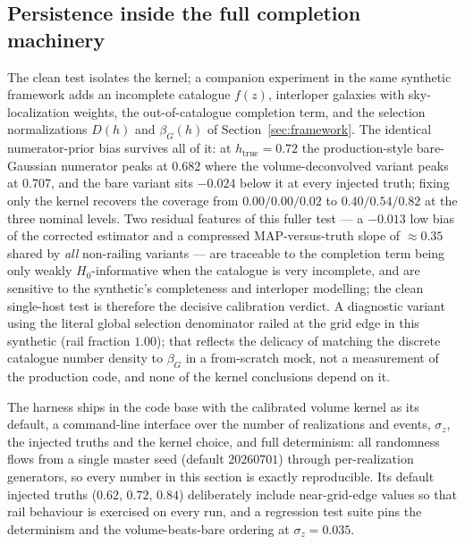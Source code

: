 \subsection{Persistence inside the full completion machinery}
\label{sec:coverage:full}

The clean test isolates the kernel; a companion experiment in the same synthetic framework adds an incomplete catalogue $f(z)$, interloper galaxies with sky-localization weights, the out-of-catalogue completion term, and the selection normalizations $D(h)$ and $\beta_G(h)$ of Section~\ref{sec:framework}. The identical numerator-prior bias survives all of it: at $h_{\mathrm{true}} = 0.72$ the production-style bare-Gaussian numerator peaks at $0.682$ where the volume-deconvolved variant peaks at $0.707$, and the bare variant sits $-0.024$ below it at every injected truth; fixing only the kernel recovers the coverage from $0.00/0.00/0.02$ to $0.40/0.54/0.82$ at the three nominal levels. %
Two residual features of this fuller test --- a $-0.013$ low bias of the corrected estimator and a compressed MAP-versus-truth slope of $\approx 0.35$ shared by \emph{all} non-railing variants --- are traceable to the completion term being only weakly $H_0$-informative when the catalogue is very incomplete, and are sensitive to the synthetic's completeness and interloper modelling; the clean single-host test is therefore the decisive calibration verdict. %
A diagnostic variant using the literal global selection denominator railed at the grid edge in this synthetic (rail fraction $1.00$); that reflects the delicacy of matching the discrete catalogue number density to $\beta_G$ in a from-scratch mock, not a measurement of the production code, and none of the kernel conclusions depend on it. %

The harness ships in the code base with the calibrated volume kernel as its default, a command-line interface over the number of realizations and events, $\sigma_z$, the injected truths and the kernel choice, and full determinism: all randomness flows from a single master seed (default $20260701$) through per-realization generators, so every number in this section is exactly reproducible. Its default injected truths ($0.62$, $0.72$, $0.84$) deliberately include near-grid-edge values so that rail behaviour is exercised on every run, and a regression test suite pins the determinism and the volume-beats-bare ordering at $\sigma_z = 0.035$. %
